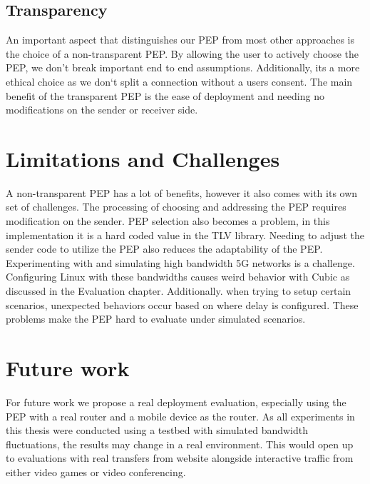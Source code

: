 \documentclass[a4paper,english, 11pt]{report}
\begin{document}
\subsection{Transparency}
An important aspect that distinguishes our PEP from most other approaches is the choice of a non-transparent PEP. By allowing the user to actively choose the PEP, we don't break important end to end assumptions. Additionally, its a more ethical choice as we don`t split a connection without a users consent. The main benefit of the transparent PEP is the ease of deployment and needing no modifications on the sender or receiver side.\\

\section{Limitations and Challenges}

A non-transparent PEP has a lot of benefits, however it also comes with its own set of challenges. The processing of choosing and addressing the PEP requires modification on the sender. PEP selection also becomes a problem, in this implementation it is a hard coded value in the TLV library. Needing to adjust the sender code to utilize the PEP also reduces the adaptability of the PEP.\\

Experimenting with and simulating high bandwidth 5G networks is a challenge. Configuring Linux with these bandwidths causes weird behavior with Cubic as discussed in the Evaluation chapter. Additionally. when trying to setup certain scenarios, unexpected behaviors occur based on where delay is configured. These problems make the PEP hard to evaluate under simulated scenarios.

\section{Future work}
For future work we propose a real deployment evaluation, especially using the PEP with a real router and a mobile device as the router. As all experiments in this thesis were conducted using a testbed with simulated bandwidth fluctuations, the results may change in a real environment. This would open up to evaluations with real transfers from website alongside interactive traffic from either video games or video conferencing.\\
\end{document}
